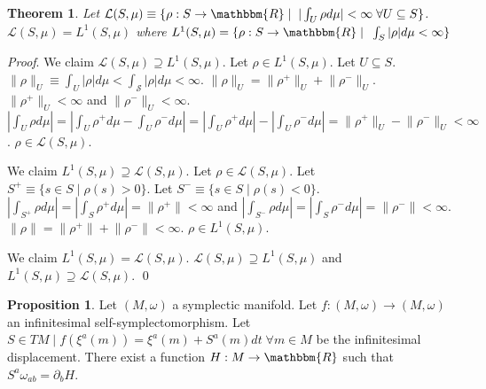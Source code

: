 \documentclass[aps,pra,10pt,twocolumn,floatfix,nofootinbib]{revtex4-1}
\numberwithin{equation}{section}
\newtheorem{thrm}[equation]{Theorem}
\theoremstyle{definition}
\newtheorem{prop}[equation]{Proposition}
\renewenvironment{proof}{\emph{Proof}.}{\qed}
\begin{document}
\begin{thrm}\label{everywhere_integrable_is_lebesgue_integrable}
	Let $\mathcal{L}(S,\mu) \equiv \{ \rho : S \rightarrow \mathbbm{R} \; | \;\; |\int_{U} \rho d\mu| < \infty \; \forall U \subseteq S\}$. $\mathcal{L}(S,\mu)=L^1(S,\mu)$ where $L^1(S,\mu) = \{ \rho : S \rightarrow \mathbbm{R} \; | \;\; \int_{S} |\rho| d\mu < \infty \}$
\end{thrm}

\begin{proof}
	We claim $\mathcal{L}(S,\mu) \supseteq L^1(S,\mu)$. Let $\rho \in L^1(S,\mu)$. Let $U \subseteq S$. $\lVert \rho \rVert_U \equiv \int_{U} |\rho| d\mu < \int_{\mathcal{S}} |\rho| d\mu < \infty$. $\lVert \rho \rVert_U = \lVert \rho^+ \rVert_U + \lVert \rho^- \rVert_U$. $\lVert \rho^+ \rVert_U < \infty$ and $\lVert \rho^- \rVert_U < \infty$. $|\int_{U} \rho d\mu| = |\int_{U} \rho^+ d\mu - \int_{U} \rho^- d\mu| = |\int_{U} \rho^+ d\mu| - |\int_{U} \rho^- d\mu| = \lVert \rho^+ \rVert_U - \lVert \rho^- \rVert_U < \infty$. $\rho \in\mathcal{L}(S,\mu)$.
	
	We claim $L^1(S,\mu) \supseteq \mathcal{L}(S,\mu)$.  Let $\rho \in \mathcal{L}(S,\mu)$. Let $S^+ \equiv  \{ s \in S \; | \; \rho(s) > 0\}$. Let $S^- \equiv  \{ s \in S \; | \; \rho(s) < 0\}$. $|\int_{S^+} \rho d\mu| = |\int_{S} \rho^+ d\mu| = \lVert \rho^+ \rVert < \infty$ and $|\int_{S^-} \rho d\mu| = |\int_{S} \rho^- d\mu| = \lVert \rho^- \rVert < \infty$. $\lVert \rho \rVert = \lVert \rho^+ \rVert + \lVert \rho^- \rVert < \infty$. $\rho \in L^1(S,\mu)$.
	
	We claim $L^1(S,\mu) = \mathcal{L}(S,\mu)$. $\mathcal{L}(S,\mu) \supseteq L^1(S,\mu)$ and $L^1(S,\mu) \supseteq \mathcal{L}(S,\mu)$.	
\end{proof}

\begin{prop}\label{symplectomorphism_generator}
	Let $(M, \omega)$ a symplectic manifold. Let $f: (M, \omega) \rightarrow (M, \omega)$ an infinitesimal self-symplectomorphism. Let $S \in TM \; | \; f(\xi^a(m)) = \xi^a(m) + S^a(m)dt \; \forall m \in M$ be the infinitesimal displacement. There exist a function $H: M \rightarrow \mathbbm{R}$ such that $S^{a} \omega_{ab} = \partial_{b}H$.
\end{prop}
\end{document}
